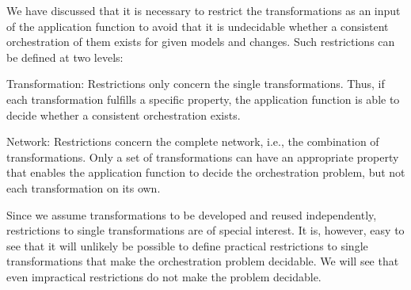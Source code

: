 We have discussed that it is necessary to restrict the transformations as an input of the application function to avoid that it is undecidable whether a consistent orchestration of them exists for given models and changes.
Such restrictions can be defined at two levels:
\begin{properdescription}
    \item[Transformation:] Restrictions only concern the single transformations. Thus, if each transformation fulfills a specific property, the application function is able to decide whether a consistent orchestration exists.
    \item[Network:] Restrictions concern the complete network, i.e., the combination of transformations. Only a set of transformations can have an appropriate property that enables the application function to decide the orchestration problem, but not each transformation on its own.
\end{properdescription}

Since we assume transformations to be developed and reused independently, restrictions to single transformations are of special interest.
It is, however, easy to see that it will unlikely be possible to define practical restrictions to single transformations that make the orchestration problem decidable.
We will see that even impractical restrictions do not make the problem decidable.




